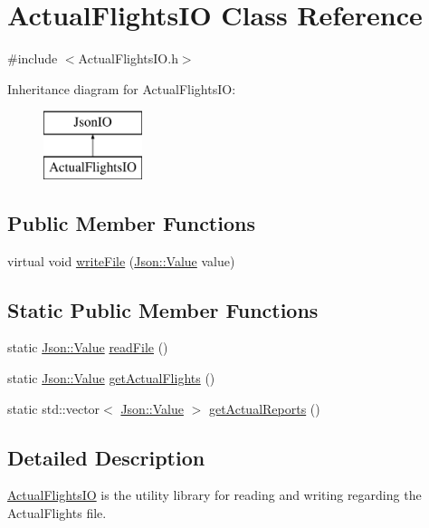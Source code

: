 \hypertarget{class_actual_flights_i_o}{}\section{Actual\+Flights\+IO Class Reference}
\label{class_actual_flights_i_o}


{\ttfamily \#include $<$Actual\+Flights\+I\+O.\+h$>$}

Inheritance diagram for Actual\+Flights\+IO\+:\begin{figure}[H]
\begin{center}
\leavevmode
\includegraphics[height=2.000000cm]{class_actual_flights_i_o}
\end{center}
\end{figure}
\subsection*{Public Member Functions}
\begin{DoxyCompactItemize}
\item 
virtual void \hyperlink{class_actual_flights_i_o_a181dc53214b2e3d7d21c28d928e5f07b}{write\+File} (\hyperlink{class_json_1_1_value}{Json\+::\+Value} value)
\end{DoxyCompactItemize}
\subsection*{Static Public Member Functions}
\begin{DoxyCompactItemize}
\item 
static \hyperlink{class_json_1_1_value}{Json\+::\+Value} \hyperlink{class_actual_flights_i_o_ae69ccbdf62e74023d2e6bf71232a55f3}{read\+File} ()
\item 
static \hyperlink{class_json_1_1_value}{Json\+::\+Value} \hyperlink{class_actual_flights_i_o_a9ea172304485a41da1d8615878ffb93f}{get\+Actual\+Flights} ()
\item 
static std\+::vector$<$ \hyperlink{class_json_1_1_value}{Json\+::\+Value} $>$ \hyperlink{class_actual_flights_i_o_ae9529e787a486c0713df9351b77bb1f6}{get\+Actual\+Reports} ()
\end{DoxyCompactItemize}


\subsection{Detailed Description}
\hyperlink{class_actual_flights_i_o}{Actual\+Flights\+IO} is the utility library for reading and writing regarding the Actual\+Flights file. 


